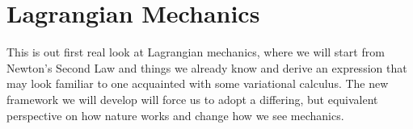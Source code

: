 \section{Lagrangian Mechanics}
This is out first real look at Lagrangian mechanics, where we will start from Newton's Second Law and things we already know and derive an expression that may look familiar to one acquainted with some variational calculus. The new framework we will develop will force us to adopt a differing, but equivalent perspective on how nature works and change how we see mechanics.



